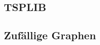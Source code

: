 \documentclass[11pt,a4paper]{article}
\begin{document}
\subsection{TSPLIB}
\subsection{Zufällige Graphen}

\newpage



\end{document}
